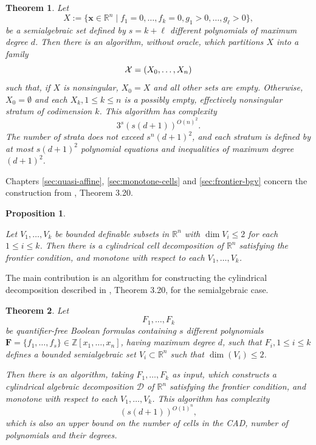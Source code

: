 \documentclass[
]{book}
\newtheorem{theorem}{Theorem}[chapter]
\newtheorem{proposition}{Proposition}[chapter]
\theoremstyle{definition}
\theoremstyle{definition}
\theoremstyle{definition}
\theoremstyle{definition}
\theoremstyle{remark}
\begin{document}
\begin{theorem}
\protect\hypertarget{thm:strat}{}\label{thm:strat}Let
\[
X := \{ \mathbf{x} \in \mathbb{R}^n \mid f_1 = 0, \ldots, f_k = 0, g_1 > 0, \ldots, g_\ell > 0 \},
\]
be a semialgebraic set defined by \(s = k + \ell\) different polynomials of maximum degree \(d\).
Then there is an algorithm, without oracle, which partitions \(X\) into a family
\[
{\cal X} = (X_0, \ldots, X_n)
\]
such that, if \(X\) is nonsingular, \(X_0 = X\) and all other sets are empty.
Otherwise, \(X_0 = \emptyset\) and each \(X_k, 1 \le k \le n\) is a possibly empty, effectively nonsingular stratum of codimension \(k\).
This algorithm has complexity
\[
3^{s}\left(s(d+1)\right)^{O(n)^{2}}.
\]
The number of strata does not exceed \(s^{n} (d + 1)^2\), and each stratum is defined by at most \(s (d + 1)^2\) polynomial equations and inequalities of maximum degree \((d + 1)^2\).
\end{theorem}

Chapters \ref{sec:quasi-affine}, \ref{sec:monotone-cells} and \ref{sec:frontier-bgv} concern the construction from
\citet{bgv15}, Theorem 3.20.

\begin{proposition}
\protect\hypertarget{prp:bgv-main}{}\label{prp:bgv-main}\citep[Theorem 3.20]{bgv15}

Let \(V_1, \ldots, V_k\) be bounded deﬁnable subsets in \(\mathbb{R}^n\) with \(\dim V_i \le 2\) for each \(1 \le i \le k\).
Then there is a cylindrical cell decomposition of \(\mathbb{R}^n\) satisfying the frontier condition, and monotone with respect to each \(V_1, \ldots, V_k\).
\end{proposition}

The main contribution is an algorithm for constructing the cylindrical decomposition described in \citet{bgv15}, Theorem 3.20, for the semialgebraic case.

\begin{theorem}
\protect\hypertarget{thm:bgv-algorithm}{}\label{thm:bgv-algorithm}Let
\[
F_1,\ldots,F_k
\]
be quantifier-free Boolean formulas containing \(s\) different polynomials \(\mathbf{F} = \{ f_1,\ldots, f_s \} \in \mathbb{Z}[x_1,\ldots,x_n]\), having maximum degree \(d\), such that \(F_i, 1\le i \le k\) defines a bounded semialgebraic set \(V_i \subset \mathbb{R}^n\) such that \(\dim(V_i) \le 2\).

Then there is an algorithm, taking \(F_1,\ldots,F_k\) as input, which constructs a cylindrical algebraic decomposition \(\mathcal{D}\) of \(\mathbb{R}^n\) satisfying the frontier condition, and monotone with respect to each \(V_1, \ldots, V_k\).
This algorithm has complexity
\[
\left(s\left(d+1\right)\right)^{O(1)^n},
\]
which is also an upper bound on the number of cells in the CAD, number of polynomials and their degrees.
\end{theorem}
\end{document}
